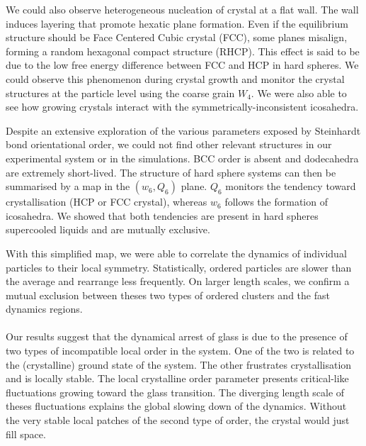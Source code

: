 We could also observe heterogeneous nucleation of crystal at a flat wall. The wall induces layering that promote hexatic plane formation. Even if the equilibrium structure should be Face Centered Cubic crystal (FCC), some planes misalign, forming a random hexagonal compact structure (RHCP). This effect is said to be due to the low free energy difference between FCC and HCP in hard spheres. We could observe this phenomenon during crystal growth and monitor the crystal structures at the particle level using the coarse grain $W_4$. We were also able to see how growing crystals interact with the symmetrically-inconsistent icosahedra.

Despite an extensive exploration of the various parameters exposed by Steinhardt bond orientational order, we could not find other relevant structures in our experimental system or in the simulations. BCC order is absent and dodecahedra are extremely short-lived. The structure of hard sphere systems can then be summarised by a map in the $(w_6, Q_6)$ plane. $Q_6$ monitors the tendency toward crystallisation (HCP or FCC crystal), whereas $w_6$ follows the formation of icosahedra. We showed that both tendencies are present in hard spheres supercooled liquids and are mutually exclusive.

With this simplified map, we were able to correlate the dynamics of individual particles to their local symmetry. Statistically, ordered particles are slower than the average and rearrange less frequently. On larger length scales, we confirm a mutual exclusion between theses two types of ordered clusters and the fast dynamics regions.

\paragraph{}

Our results suggest that the dynamical arrest of glass is due to the presence of two types of incompatible local order in the system. One of the two is related to the (crystalline) ground state of the system. The other frustrates crystallisation and is locally stable. The local crystalline order parameter presents critical-like fluctuations growing toward the glass transition. The diverging length scale of theses fluctuations explains the global slowing down of the dynamics. Without the very stable local patches of the second type of order,  the crystal would just fill space.